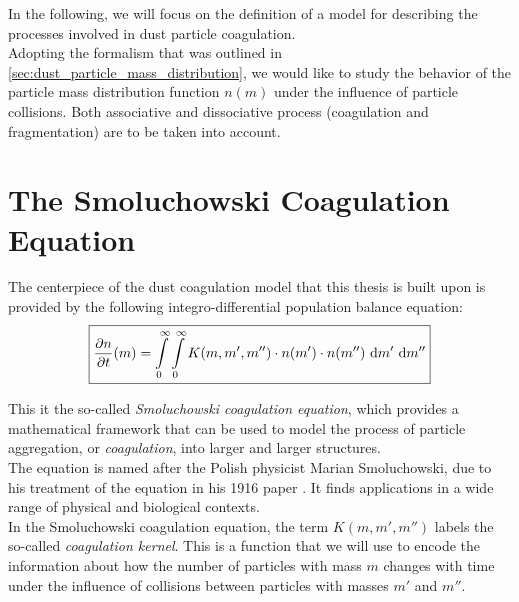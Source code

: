 
In the following, we will focus on the definition of a model for describing the 
processes involved in dust particle coagulation. \\

Adopting the formalism that was outlined in \cref{sec:dust_particle_mass_distribution},
we would like to study the behavior of the particle mass distribution function $n(m)$
under the influence of particle collisions. Both associative and dissociative process 
(coagulation and fragmentation) are to be taken into account.

\section{The Smoluchowski Coagulation Equation}

    The centerpiece of the dust coagulation model that this thesis is built upon is provided 
    by the following integro-differential population balance equation:
    \begin{equation}
        \label{eq:continuous_smoluchowski_equation}
        \boxed{
        \frac{\partial n}{\partial t}(m)
            =
                \int\limits_0^\infty
                \int\limits_0^\infty
                K(m,m',m'')
                \cdot n(m')
                \cdot n(m'')
                \ \text{d} m'
                \ \text{d} m''
        }
    \end{equation}

    This it the so-called \textit{Smoluchowski coagulation equation}, which provides a 
    mathematical framework that can be used to model the process of particle aggregation, 
    or \textit{coagulation}, into larger and larger structures. \\

    The equation is named after the Polish physicist Marian Smoluchowski, due to his treatment 
    of the equation in his 1916 paper \cite{smoluchowski_1916}. 
    It finds applications in a wide range of physical and biological contexts. \\ 

    In the Smoluchowski coagulation equation, the term $K(m, m', m'')$ labels the so-called
    \textit{coagulation kernel}. 
    This is a function that we will use to encode the information about how the number of 
    particles with mass $m$ changes with time under the influence of collisions between 
    particles with masses $m'$ and $m''$. \\

